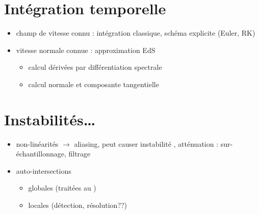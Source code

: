 \section{Intégration temporelle}%
\begin{itemize}
	\item champ de vitesse connu : intégration classique, schéma explicite (Euler, RK)
	\item vitesse normale connue : approximation EdS
	\begin{itemize}
		\item calcul dérivées par différentiation spectrale
		\item calcul normale et composante tangentielle
	\end{itemize}
\end{itemize}


\section{Instabilités\ldots}
\begin{itemize}
	\item non-linéarités $\to$ aliasing, peut causer instabilité \cite{rahimian2015}, atténuation : sur-échantillonnage, filtrage
	\item auto-intersections
	\begin{itemize}
		\item globales (traitées au )
		\item locales \cite{farouki1986} (détection, résolution??)
	\end{itemize}
\end{itemize}
